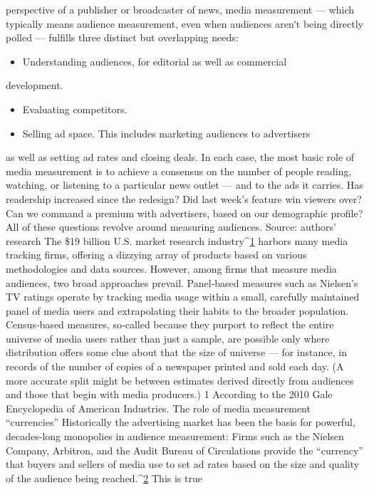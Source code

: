 perspective of a publisher or broadcaster of news, media measurement —
which typically means audience measurement, even when audiences
arenʹt being directly polled — fulfills three distinct but overlapping needs:
\begin{itemize}
\item Understanding audiences, for editorial as well as commercial
\end{itemize}
development.
\begin{itemize}
\item Evaluating competitors.
\item Selling ad space. This includes marketing audiences to advertisers
\end{itemize}
as well as setting ad rates and closing deals.
In each case, the most basic role of media measurement is to achieve a
consensus on the number of people reading, watching, or listening to a
particular news outlet — and to the ads it carries. Has readership
increased since the redesign? Did last week’s feature win viewers over?
Can we command a premium with advertisers, based on our demographic
profile? All of these questions revolve around measuring audiences.
Source: authors’ research
The \$19 billion U.S. market research industry^{\href{#endnotes}{1}} harbors many media
tracking firms, offering a dizzying array of products based on various
methodologies and data sources. However, among firms that measure
media audiences, two broad approaches prevail. Panel‐based measures
such as Nielsen’s TV ratings operate by tracking media usage within a
small, carefully maintained panel of media users and extrapolating their
habits to the broader population. Census‐based measures, so‐called
because they purport to reflect the entire universe of media users rather
than just a sample, are possible only where distribution offers some clue
about that the size of universe — for instance, in records of the number of
copies of a newspaper printed and sold each day. (A more accurate split
might be between estimates derived directly from audiences and those
that begin with media producers.)
1 According to the 2010 Gale Encyclopedia of American Industries.
The role of media measurement ``currencies''
Historically the advertising market has been the basis for powerful,
decades‐long monopolies in audience measurement: Firms such as the
Nielsen Company, Arbitron, and the Audit Bureau of Circulations
provide the ``currency'' that buyers and sellers of media use to set ad rates
based on the size and quality of the audience being reached.^{\href{#endnotes}{2}} This is true
